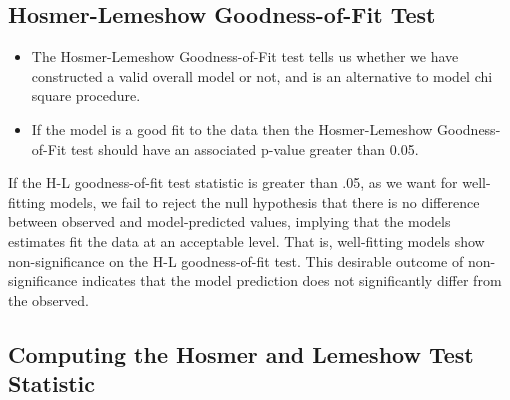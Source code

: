\documentclass[a4paper,12pt]{article}
\begin{document}
\subsection{Hosmer-Lemeshow Goodness-of-Fit Test}
\begin{framed}
	\begin{itemize}
		\item The Hosmer-Lemeshow Goodness-of-Fit
		test tells us whether we have constructed a valid overall model or not, and is an alternative to model chi square procedure.
		\item If the model is a good fit to the data then the Hosmer-Lemeshow Goodness-of-Fit test should have an associated p-value greater than 0.05.
	\end{itemize} 
\end{framed}
If the H-L goodness-of-fit test statistic is greater than .05, as we want for well-fitting models, we fail to reject the null hypothesis that there is no difference between observed and model-predicted values, implying that the models estimates fit the data at an acceptable level. That is, well-fitting models show non-significance on the
H-L goodness-of-fit test. This desirable outcome of non-significance indicates that the
model prediction does not significantly differ from the observed.

\subsection{Computing the Hosmer and Lemeshow Test Statistic}
\end{document}
